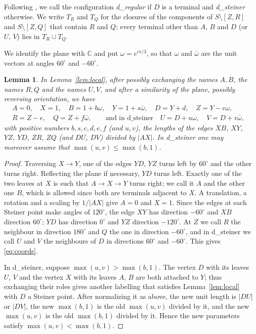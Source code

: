 \documentclass[11pt]{amsart}
\newtheorem{lemma}[theorem]{Lemma}
\theoremstyle{definition}
\theoremstyle{remark}
\numberwithin{equation}{section}
\begin{document}
Following \cite{KHSHGW}, we call the configuration \emph{d\_regular} if $D$ is a terminal and \emph{d\_steiner} otherwise. We write $T_R$ and $T_Q$ for the closures of the components of $S\setminus[Z,R]$ and $S\setminus[Z,Q]$ that contain $R$ and $Q$; every terminal other than $A$, $B$ and $D$ (or $U$, $V$) lies in $T_R\cup T_Q$.

We identify the plane with $\mathbb C$ and put $\omega=e^{i\pi/3}$, so that $\omega$ and $\bar\omega$ are the unit vectors at angles $60^\circ$ and $-60^\circ$.

\begin{lemma}\label{lem:coords}
In Lemma~\ref{lem:local}, after possibly exchanging the names $A,B$, the names $R,Q$ and the names $U,V$, and after a similarity of the plane, possibly reversing orientation, we have
\begin{equation}\label{eq:coords}
\begin{gathered}
A=0,\quad X=1,\quad B=1+b\omega,\quad Y=1+s\bar\omega,\quad D=Y+d,\quad Z=Y-c\omega,\\
R=Z-e,\quad Q=Z+f\bar\omega,\qquad\text{and in d\_steiner}\quad U=D+u\omega,\quad V=D+v\bar\omega,
\end{gathered}
\end{equation}
with positive numbers $b,s,c,d,e,f$ (and $u,v$), the lengths of the edges $XB$, $XY$, $YZ$, $YD$, $ZR$, $ZQ$ (and $DU$, $DV$) divided by $|AX|$. In d\_steiner one may moreover assume that $\max(u,v)\le\max(b,1)$.
\end{lemma}

\begin{proof}
Traversing $X\to Y$, one of the edges $YD$, $YZ$ turns left by $60^\circ$ and the other turns right. Reflecting the plane if necessary, $YD$ turns left. Exactly one of the two leaves at $X$ is such that $A\to X\to Y$ turns right; we call it $A$ and the other one $B$, which is allowed since both are terminals adjacent to $X$. A translation, a rotation and a scaling by $1/|AX|$ give $A=0$ and $X=1$. Since the edges at each Steiner point make angles of $120^\circ$, the edge $XY$ has direction $-60^\circ$ and $XB$ direction $60^\circ$; $YD$ has direction $0^\circ$ and $YZ$ direction $-120^\circ$. At $Z$ we call $R$ the neighbour in direction $180^\circ$ and $Q$ the one in direction $-60^\circ$, and in d\_steiner we call $U$ and $V$ the neighbours of $D$ in directions $60^\circ$ and $-60^\circ$. This gives \eqref{eq:coords}.

In d\_steiner, suppose $\max(u,v)>\max(b,1)$. The vertex $D$ with its leaves $U$, $V$ and the vertex $X$ with its leaves $A$, $B$ are both attached to $Y$; thus exchanging their roles gives another labelling that satisfies Lemma~\ref{lem:local} with $D$ a Steiner point. After normalizing it as above, the new unit length is $|DU|$ or $|DV|$, the new $\max(b,1)$ is the old $\max(u,v)$ divided by it, and the new $\max(u,v)$ is the old $\max(b,1)$ divided by it. Hence the new parameters satisfy $\max(u,v)<\max(b,1)$.
\end{proof}
\end{document}
